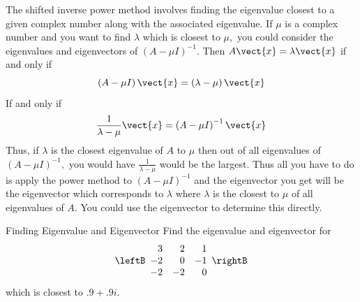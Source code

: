 The shifted inverse power method involves finding the eigenvalue closest to
a given complex number along with the associated eigenvalue. If $\mu $ is a
complex number and you want to find $\lambda $ which is closest to $\mu ,$
you could consider the eigenvalues and eigenvectors of $\left( A-\mu
I\right) ^{-1}$. Then $A\vect{x}=\lambda \vect{x}$ if and only if 
\begin{equation*}
\left( A-\mu I\right) \vect{x}=\left( \lambda -\mu \right) \vect{x}
\end{equation*}
If and only if 
\begin{equation*}
\frac{1}{\lambda -\mu }\vect{x}=\left( A-\mu I\right) ^{-1}\vect{x}
\end{equation*}
Thus, if $\lambda $ is the closest eigenvalue of $A$ to $\mu $ then out of
all eigenvalues of $\left( A-\mu I\right) ^{-1},$ you would have $\frac{1}{
\lambda -\mu }$ would be the largest. Thus all you have to do is apply the
power method to $\left( A-\mu I\right) ^{-1}$ and the eigenvector you get
will be the eigenvector which corresponds to $\lambda $ where $\lambda $ is
the closest to $\mu $ of all eigenvalues of $A$. You could use the
eigenvector to determine this directly.

\begin{example}{Finding Eigenvalue and Eigenvector}
Find the eigenvalue and eigenvector for 
\begin{equation*}
\leftB 
\begin{array}{rrr}
3 & 2 & 1 \\ 
-2 & 0 & -1 \\ 
-2 & -2 & 0
\end{array}
\rightB
\end{equation*}
which is closest to $.9+.9i$.
\end{example}

